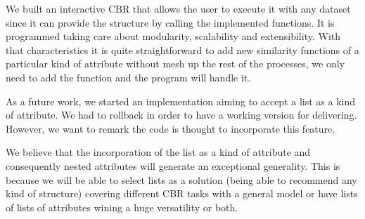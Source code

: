 \documentclass[11pt]{article}
\begin{document}
We built an interactive CBR that allows the user to execute it with any dataset since it can provide the structure by calling the implemented functions. It is programmed taking care about modularity, scalability and extensibility. With that characteristics it is quite straightforward to add new similarity functions of a particular kind of attribute without mesh up the rest of the processes, we only need to add the function and the program will handle it.

As a future work, we started an implementation aiming to accept a list as a kind of attribute. We had to rollback in order to have a working version for delivering. However, we want to remark the code is thought to incorporate this feature.

We believe that the incorporation of the list as a kind of attribute and consequently nested attributes will generate an exceptional generality. This is because we will be able to select lists as a solution (being able to recommend any kind of structure) covering different CBR tasks with a general model or have lists of lists of attributes wining a huge versatility or both.
\end{document}
